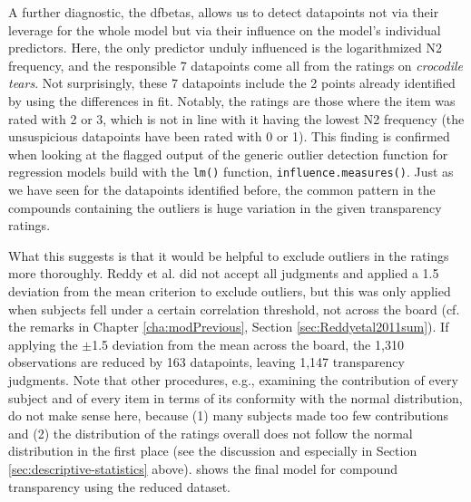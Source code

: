 A further diagnostic, the dfbetas, allows us to detect datapoints not
via their leverage for the whole model but via their influence on the model's individual
predictors. Here, the only predictor unduly influenced is the
logarithmized N2 frequency, and the responsible 7 datapoints come all
from the ratings on \emph{crocodile tears}. Not surprisingly, these 7
datapoints include the 2 points already identified by using the
differences in fit. Notably, the ratings are those where the item was rated with
2 or 3, which is not in line with it having the lowest N2 frequency
(the unsuspicious datapoints have been rated with 0 or 1). This
finding is confirmed when looking at the flagged output of the generic
outlier detection function for regression models build with the \texttt{lm()} function,
\texttt{influence.measures()}. 
Just as we have seen for the datapoints identified before, the
common pattern in the compounds containing the outliers is huge variation in the given transparency ratings.

What this suggests is that it would be helpful to exclude outliers in
the ratings more thoroughly.
Reddy et al. did not accept all judgments and applied a 1.5 deviation
from the mean criterion to exclude outliers, but this was only applied
when subjects fell under a certain correlation threshold, not across
the board (cf. the remarks in Chapter \ref{cha:modPrevious}, Section
\ref{sec:Reddyetal2011sum}). If applying the $\pm$1.5 deviation from
the mean across the board, the 1,310 observations are reduced by 163
datapoints, leaving 1,147 transparency judgments. Note that other
procedures, e.g., examining the contribution of every subject and of
every item in terms of its conformity with the normal distribution, do
not make sense here, because (1) many subjects made too few
contributions and (2) the distribution of the ratings overall does not
follow the normal distribution in the first place (see the discussion
and especially  in Section
\ref{sec:descriptive-statistics} above).\enlargethispage{1\baselineskip}
 shows the final model
for compound transparency using the reduced dataset.

